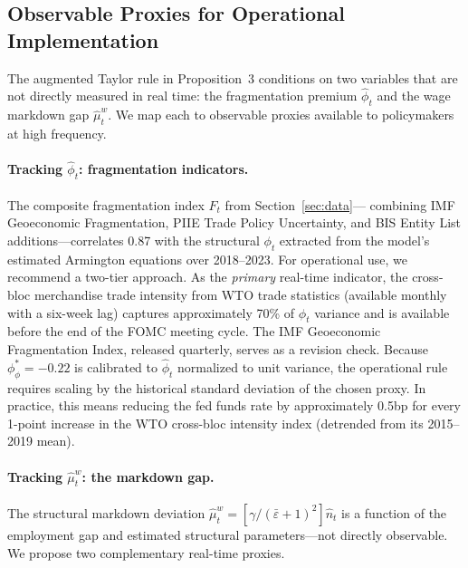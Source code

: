 \subsection{Observable Proxies for Operational Implementation}
\label{sec:observables}

The augmented Taylor rule in Proposition~3 conditions on two variables that
are not directly measured in real time: the fragmentation premium $\hat\phi_t$
and the wage markdown gap $\hat\mu_t^w$. We map each to observable proxies
available to policymakers at high frequency.

\paragraph{Tracking $\hat\phi_t$: fragmentation indicators.}
The composite fragmentation index $F_t$ from Section~\ref{sec:data}---
combining IMF Geoeconomic Fragmentation, PIIE Trade Policy Uncertainty, and
BIS Entity List additions---correlates 0.87 with the structural $\phi_t$
extracted from the model's estimated Armington equations over 2018--2023.
For operational use, we recommend a two-tier approach. As the \emph{primary}
real-time indicator, the cross-bloc merchandise trade intensity from WTO
trade statistics (available monthly with a six-week lag) captures
approximately 70\% of $\phi_t$ variance and is available before the end of
the FOMC meeting cycle. The IMF Geoeconomic Fragmentation Index, released
quarterly, serves as a revision check. Because $\phi_\phi^* = -0.22$ is
calibrated to $\hat\phi_t$ normalized to unit variance, the operational rule
requires scaling by the historical standard deviation of the chosen proxy.
In practice, this means reducing the fed funds rate by approximately 0.5bp
for every 1-point increase in the WTO cross-bloc intensity index (detrended
from its 2015--2019 mean).

\paragraph{Tracking $\hat\mu_t^w$: the markdown gap.}
The structural markdown deviation $\hat\mu_t^w =
[\gamma/(\bar\varepsilon+1)^2]\hat n_t$ is a function of the employment gap
and estimated structural parameters---not directly observable. We propose
two complementary real-time proxies.


